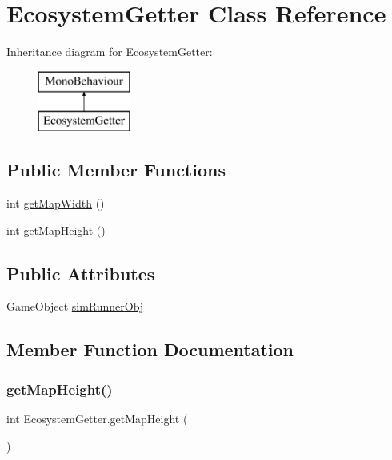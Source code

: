 \hypertarget{class_ecosystem_getter}{}\section{Ecosystem\+Getter Class Reference}
\label{class_ecosystem_getter}
Inheritance diagram for Ecosystem\+Getter\+:\begin{figure}[H]
\begin{center}
\leavevmode
\includegraphics[height=2.000000cm]{class_ecosystem_getter}
\end{center}
\end{figure}
\subsection*{Public Member Functions}
\begin{DoxyCompactItemize}
\item 
int \mbox{\hyperlink{class_ecosystem_getter_a9dab6af6bc871d8e8c6f29bbdcb18483}{get\+Map\+Width}} ()
\item 
int \mbox{\hyperlink{class_ecosystem_getter_abfaba89089f5c6095ca138168a630732}{get\+Map\+Height}} ()
\end{DoxyCompactItemize}
\subsection*{Public Attributes}
\begin{DoxyCompactItemize}
\item 
Game\+Object \mbox{\hyperlink{class_ecosystem_getter_a2a8755cd95e4f94ee8924c699e63a2b8}{sim\+Runner\+Obj}}
\end{DoxyCompactItemize}


\subsection{Member Function Documentation}
\mbox{\label{class_ecosystem_getter_abfaba89089f5c6095ca138168a630732}} 
\subsubsection{\texorpdfstring{get\+Map\+Height()}{getMapHeight()}}
{\footnotesize\ttfamily int Ecosystem\+Getter.\+get\+Map\+Height (\begin{DoxyParamCaption}{ }\end{DoxyParamCaption})}

